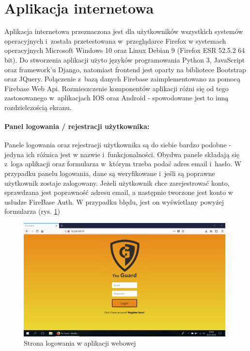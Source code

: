 \section*{Aplikacja internetowa}
Aplikacja internetowa przeznaczona jest dla użytkowników wszystkich systemów operacyjnych i~została przetestowana w~przeglądarce Firefox w systemach operacyjnych Microsoft Windows 10 oraz Linux Debian 9 (Firefox ESR 52.5.2 64 bit). Do stworzenia aplikacji użyto języków programowania Python 3, JavaScript oraz framework'u Django, natomiast frontend jest oparty na bibliotece Bootstrap oraz JQuery. Połączenie z~bazą danych Firebase zaimplementowano za pomocą Firebase Web Api. Rozmieszczenie komponentów aplikacji różni się od tego zastosowanego w~aplikacjach IOS oraz Android - spowodowane jest to inną rozdzielczością ekranu. 

\paragraph{Panel logowania / rejestracji użytkownika:} Panele logowania oraz rejestracji użytkownika są do siebie bardzo podobne - jedyna ich różnica jest w nazwie i~funkcjonalności. Obydwa panele składają się z~loga aplikacji oraz formularza w~którym trzeba podać adres email i~hasło. W przypadku panelu logowania, dane są weryfikowane i~jeśli są poprawne użytkownik zostaje zalogowany. Jeżeli użytkownik chce zarejestrować konto, sprawdzana jest poprawność adresu email, a następnie tworzone jest konto w usłudze FireBase Auth. W przypadku błędu, jest on wyświetlany powyżej formularza (rys. \ref{web_login})

\begin{figure}[ht]
	\centering
	\includegraphics[width=11cm]{web_screenshots/login.png}
	\caption{Strona logowania w aplikacji webowej}
	\label{web_login}
\end{figure}

